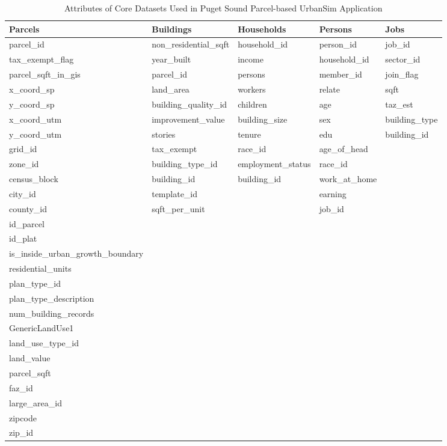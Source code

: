 \begin{table}
\caption{Attributes of Core Datasets Used in Puget Sound Parcel-based UrbanSim Application}
\label{tab:parcel-attributes}
\begin{tabular}{p{3cm}p{2.8cm}p{2.7cm}p{2.5cm}p{2.5cm}}
\toprule
Parcels & Buildings & Households    & Persons & Jobs \\
\midrule
parcel\_id  & non\_residential\_sqft    & household\_id & person\_id & job\_id \\
tax\_exempt\_flag & year\_built & income    & household\_id & sector\_id\\
parcel\_sqft\_in\_gis & parcel\_id  & persons    & member\_id & join\_flag\\
x\_coord\_sp &  land\_area  & workers & relate & sqft\\
y\_coord\_sp    & building\_quality\_id & children &    age & taz\_est\\
x\_coord\_utm   & improvement\_value    & building\_size    & sex & building\_type\\
y\_coord\_utm   & stories   & tenure    & edu & building\_id\\
grid\_id    & tax\_exempt   & race\_id & age\_of\_head  \\
zone\_id    & building\_type\_id    & employment\_status & race\_id &\\
census\_block   &  building\_id & building\_id & work\_at\_home &\\
city\_id    & template\_id  & & earning & \\
county\_id   &  sqft\_per\_unit & & job\_id & \\
id\_parcel  & & & &\\
id\_plat & & & &\\
is\_inside\_urban\_growth\_boundary & & & & \\
residential\_units  & & & & \\
plan\_type\_id & & & &\\
plan\_type\_description & & & &\\
num\_building\_records & & & &\\
GenericLandUse1 & & & &\\
land\_use\_type\_id & & & &\\
land\_value & & & &\\
parcel\_sqft & & & &\\
faz\_id & & & &\\
large\_area\_id & & & &\\
zipcode & & & &\\
zip\_id & & & &\\
\bottomrule
\end{tabular}
\end{table}



